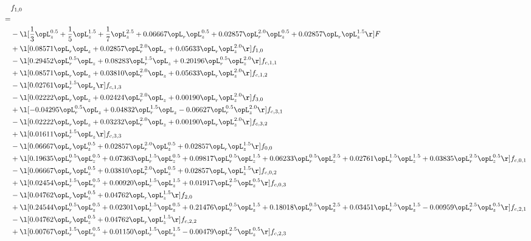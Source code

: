 \begin{alignat}{2} 
\label{eq:f_10_1} 
& f_{1,0} \nonumber \\ 
 = \\ 
& - \l[ \frac{1}{3} \opL_z^{0.5} + \frac{1}{5} \opL_z^{1.5} + \frac{1}{7} \opL_z^{2.5} +  0.06667 \opL_r \opL_z^{0.5} +  0.02857 \opL_r^{2.0} \opL_z^{0.5} +  0.02857 \opL_r \opL_z^{1.5}  \r] F \nonumber \\ 
& + \l[  0.08571 \opL_r \opL_z +  0.02857 \opL_r^{2.0} \opL_z +  0.05633 \opL_r \opL_z^{2.0}  \r] f_{1,0} \nonumber \\ 
& - \l[  0.29452 \opL_r^{0.5} \opL_z +  0.08283 \opL_r^{1.5} \opL_z +  0.20196 \opL_r^{0.5} \opL_z^{2.0}  \r] f_{c,1,1} \nonumber \\ 
& + \l[  0.08571 \opL_r \opL_z +  0.03810 \opL_r^{2.0} \opL_z +  0.05633 \opL_r \opL_z^{2.0}  \r] f_{c,1,2} \nonumber \\ 
& - \l[  0.02761 \opL_r^{1.5} \opL_z  \r] f_{c,1,3} \nonumber \\ 
& - \l[  0.02222 \opL_r \opL_z +  0.02424 \opL_r^{2.0} \opL_z +  0.00190 \opL_r \opL_z^{2.0}  \r] f_{3,0} \nonumber \\ 
& + \l[  -0.04295 \opL_r^{0.5} \opL_z +  0.04832 \opL_r^{1.5} \opL_z   -0.06627 \opL_r^{0.5} \opL_z^{2.0}  \r] f_{c,3,1} \nonumber \\ 
& - \l[  0.02222 \opL_r \opL_z +  0.03232 \opL_r^{2.0} \opL_z +  0.00190 \opL_r \opL_z^{2.0}  \r] f_{c,3,2} \nonumber \\ 
& + \l[  0.01611 \opL_r^{1.5} \opL_z  \r] f_{c,3,3} \nonumber \\ 
& - \l[  0.06667 \opL_r \opL_z^{0.5} +  0.02857 \opL_r^{2.0} \opL_z^{0.5} +  0.02857 \opL_r \opL_z^{1.5}  \r] f_{0,0} \nonumber \\ 
& + \l[  0.19635 \opL_r^{0.5} \opL_z^{0.5} +  0.07363 \opL_r^{1.5} \opL_z^{0.5} +  0.09817 \opL_r^{0.5} \opL_z^{1.5} +  0.06233 \opL_r^{0.5} \opL_z^{2.5} +  0.02761 \opL_r^{1.5} \opL_z^{1.5} +  0.03835 \opL_r^{2.5} \opL_z^{0.5}  \r] f_{c,0,1} \nonumber \\ 
& - \l[  0.06667 \opL_r \opL_z^{0.5} +  0.03810 \opL_r^{2.0} \opL_z^{0.5} +  0.02857 \opL_r \opL_z^{1.5}  \r] f_{c,0,2} \nonumber \\ 
& + \l[  0.02454 \opL_r^{1.5} \opL_z^{0.5} +  0.00920 \opL_r^{1.5} \opL_z^{1.5} +  0.01917 \opL_r^{2.5} \opL_z^{0.5}  \r] f_{c,0,3} \nonumber \\ 
& - \l[  0.04762 \opL_r \opL_z^{0.5} +  0.04762 \opL_r \opL_z^{1.5}  \r] f_{2,0} \nonumber \\ 
& + \l[  0.24544 \opL_r^{0.5} \opL_z^{0.5} +  0.02301 \opL_r^{1.5} \opL_z^{0.5} +  0.21476 \opL_r^{0.5} \opL_z^{1.5} +  0.18018 \opL_r^{0.5} \opL_z^{2.5} +  0.03451 \opL_r^{1.5} \opL_z^{1.5}   -0.00959 \opL_r^{2.5} \opL_z^{0.5}  \r] f_{c,2,1} \nonumber \\ 
& - \l[  0.04762 \opL_r \opL_z^{0.5} +  0.04762 \opL_r \opL_z^{1.5}  \r] f_{c,2,2} \nonumber \\ 
& + \l[  0.00767 \opL_r^{1.5} \opL_z^{0.5} +  0.01150 \opL_r^{1.5} \opL_z^{1.5}   -0.00479 \opL_r^{2.5} \opL_z^{0.5}  \r] f_{c,2,3} \nonumber \\ 
\end{alignat} 


